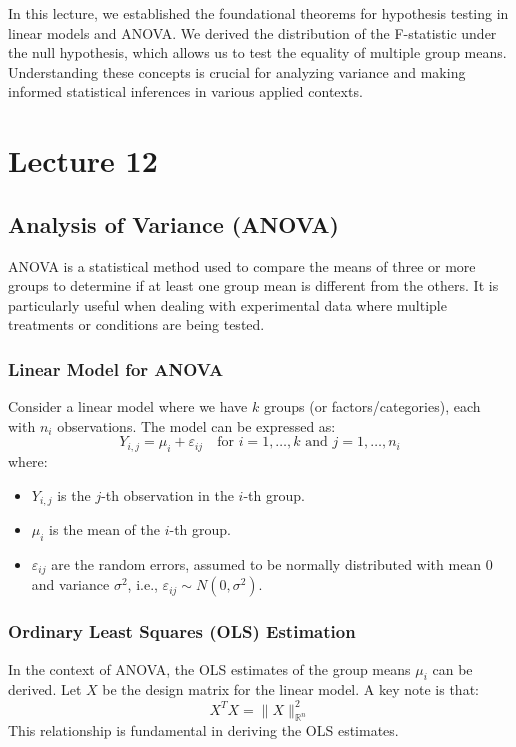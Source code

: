 \documentclass[open=any, 11pt,paper=A4]{scrreprt}
\begin{document}
In this lecture, we established the foundational theorems for hypothesis testing in linear models and ANOVA. We derived the distribution of the F-statistic under the null hypothesis, which allows us to test the equality of multiple group means. Understanding these concepts is crucial for analyzing variance and making informed statistical inferences in various applied contexts.

\chapter{Lecture 12}
\section{Analysis of Variance (ANOVA)}

ANOVA is a statistical method used to compare the means of three or more groups to determine if at least one group mean is different from the others. It is particularly useful when dealing with experimental data where multiple treatments or conditions are being tested.

\subsection{Linear Model for ANOVA}

Consider a linear model where we have $k$ groups (or factors/categories), each with $n_i$ observations. The model can be expressed as:
\[
Y_{i,j} = \mu_i + \varepsilon_{ij} \quad \text{for } i = 1, \dots, k \text{ and } j = 1, \dots, n_i
\]
where:
\begin{itemize}
    \item $Y_{i,j}$ is the $j$-th observation in the $i$-th group.
    \item $\mu_i$ is the mean of the $i$-th group.
    \item $\varepsilon_{ij}$ are the random errors, assumed to be normally distributed with mean $0$ and variance $\sigma^2$, i.e., $\varepsilon_{ij} \sim N(0, \sigma^2)$.
\end{itemize}

\subsection{Ordinary Least Squares (OLS) Estimation}

In the context of ANOVA, the OLS estimates of the group means $\mu_i$ can be derived. Let $X$ be the design matrix for the linear model. A key note is that:
\[
X^T X = \|X\|^2_{\mathbb{R}^n}
\]
This relationship is fundamental in deriving the OLS estimates.
\end{document}
